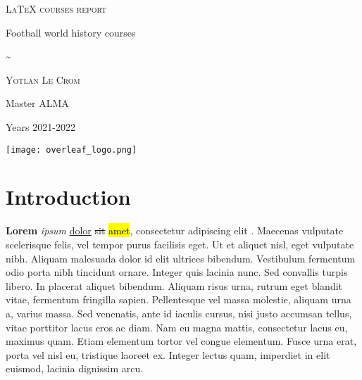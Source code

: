 \documentclass[a4paper,15pt]{article}
\begin{document}

	\begin{titlepage}
		\null	
		\vfill
	
		\centering
		
		
			{\LARGE\scshape LaTeX courses report}

				\vspace{1cm}	
	
			{\Large Football world history courses}

				\vspace{0.75cm}
	
			\textasciitilde
	
				\vspace{0.3cm}

		\begin{center}
		
		
		    {\large\scshape Yotlan Le Crom}

				\vspace{0.5cm}
			
			Master ALMA
			
			Years 2021-2022
		\end{center}
		
		\vspace{1cm}
		
	
		{\centering
			\texttt{[image: overleaf\_logo.png]}
		\par}
	
			\vfill

	\end{titlepage}
	
	\tableofcontents
	
	\setcounter{page}{1}
	\setlength{\parskip}{1em}

\newpage

\section{Introduction}

\textbf{Lorem} \textit{ipsum} \underline{dolor} \st{sit} \hl{amet}, consectetur adipiscing elit \cite{source1}. Maecenas vulputate scelerisque felis, vel tempor purus facilisis eget. Ut et aliquet nisl, eget vulputate nibh. Aliquam malesuada dolor id elit ultrices bibendum. Vestibulum fermentum odio porta nibh tincidunt ornare\cite{source2,source3}. Integer quis lacinia nunc. Sed convallis turpis libero. In placerat aliquet bibendum. Aliquam risus urna, rutrum eget blandit vitae, fermentum fringilla sapien. Pellentesque vel massa molestie, aliquam urna a, varius massa. Sed venenatis, ante id iaculis cursus, nisi justo accumsan tellus, vitae porttitor lacus eros ac diam. Nam eu magna mattis, consectetur lacus eu, maximus quam. Etiam elementum tortor vel congue elementum. Fusce urna erat, porta vel nisl eu, tristique laoreet ex. Integer lectus quam, imperdiet in elit euismod, lacinia dignissim arcu.
\end{document}
